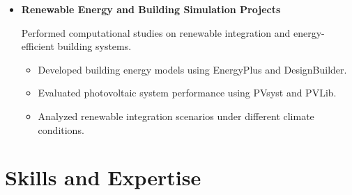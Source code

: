 \documentclass[letter,20pt]{article}
\begin{document}
\begin{itemize}
\begin{itemize}
\end{itemize}



\vspace{10pt}



\item[]
\textbf{
Renewable Energy and Building Simulation Projects
}



\vspace{3pt}


Performed computational studies on renewable integration and energy-efficient building systems.



\begin{itemize}
[
noitemsep,
leftmargin=4ex
]


\item
Developed building energy models using EnergyPlus and DesignBuilder.

\item
Evaluated photovoltaic system performance using PVsyst and PVLib.

\item
Analyzed renewable integration scenarios under different climate conditions.

\end{itemize}



\end{itemize}








\section{\textbf{Skills and Expertise}}

\vspace{5pt}
\end{document}
